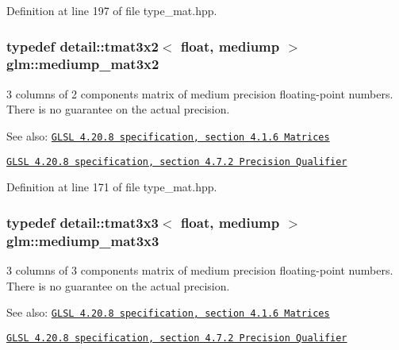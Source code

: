 Definition at line 197 of file type\_\-mat.hpp.\hypertarget{group__core__precision_g1215b70c2750b6e9ab813ced8dcae568}{
\subsubsection[mediump\_\-mat3x2]{\setlength{\rightskip}{0pt plus 5cm}typedef detail::tmat3x2$<$ float, mediump $>$ {\bf glm::mediump\_\-mat3x2}}}
\label{group__core__precision_g1215b70c2750b6e9ab813ced8dcae568}


3 columns of 2 components matrix of medium precision floating-point numbers. There is no guarantee on the actual precision.

\begin{Desc}
\item[See also:]\href{http://www.opengl.org/registry/doc/GLSLangSpec.4.20.8.pdf}{\tt GLSL 4.20.8 specification, section 4.1.6 Matrices} 

\href{http://www.opengl.org/registry/doc/GLSLangSpec.4.20.8.pdf}{\tt GLSL 4.20.8 specification, section 4.7.2 Precision Qualifier} \end{Desc}


Definition at line 171 of file type\_\-mat.hpp.\hypertarget{group__core__precision_ge4c7f0d5d3dab712f9a671183e63e5ab}{
\subsubsection[mediump\_\-mat3x3]{\setlength{\rightskip}{0pt plus 5cm}typedef detail::tmat3x3$<$ float, mediump $>$ {\bf glm::mediump\_\-mat3x3}}}
\label{group__core__precision_ge4c7f0d5d3dab712f9a671183e63e5ab}


3 columns of 3 components matrix of medium precision floating-point numbers. There is no guarantee on the actual precision.

\begin{Desc}
\item[See also:]\href{http://www.opengl.org/registry/doc/GLSLangSpec.4.20.8.pdf}{\tt GLSL 4.20.8 specification, section 4.1.6 Matrices} 

\href{http://www.opengl.org/registry/doc/GLSLangSpec.4.20.8.pdf}{\tt GLSL 4.20.8 specification, section 4.7.2 Precision Qualifier} \end{Desc}


